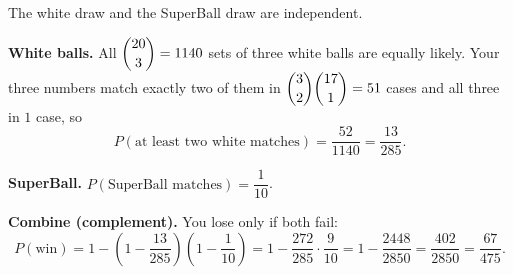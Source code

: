 The white draw and the SuperBall draw are independent.

\textbf{White balls.} All $\dbinom{20}{3}=1140$ sets of three white balls are equally likely. Your three numbers match exactly two of them in $\dbinom32\dbinom{17}{1}=51$ cases and all three in $1$ case, so
\[
P(\text{at least two white matches})=\dfrac{52}{1140}=\dfrac{13}{285}.
\]

\textbf{SuperBall.} $P(\text{SuperBall matches})=\dfrac{1}{10}$.

\textbf{Combine (complement).} You lose only if both fail:
\[
P(\text{win})=1-\left(1-\dfrac{13}{285}\right)\left(1-\dfrac{1}{10}\right)=1-\dfrac{272}{285}\cdot\dfrac{9}{10}=1-\dfrac{2448}{2850}=\dfrac{402}{2850}=\boxed{\dfrac{67}{475}}.
\]
